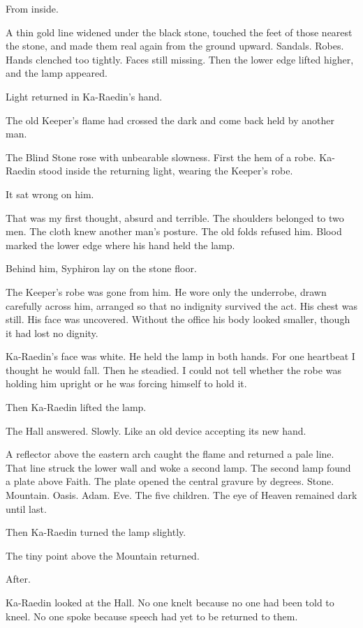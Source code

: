 From inside.\par
A thin gold line widened under the black stone, touched the feet of those nearest the stone, and made them real again from the ground upward.
Sandals.
Robes.
Hands clenched too tightly.
Faces still missing.
Then the lower edge lifted higher, and the lamp appeared.\par
Light returned in Ka-Raedin's hand.\par
The old Keeper's flame had crossed the dark and come back held by another man.\par
The Blind Stone rose with unbearable slowness.
First the hem of a robe.
Ka-Raedin stood inside the returning light, wearing the Keeper's robe.\par
It sat wrong on him.\par
That was my first thought, absurd and terrible.
The shoulders belonged to two men.
The cloth knew another man's posture.
The old folds refused him.
Blood marked the lower edge where his hand held the lamp.\par
Behind him, Syphiron lay on the stone floor.\par
The Keeper's robe was gone from him.
He wore only the underrobe, drawn carefully across him, arranged so that no indignity survived the act.
His chest was still.
His face was uncovered.
Without the office his body looked smaller, though it had lost no dignity.\par
Ka-Raedin's face was white.
He held the lamp in both hands.
For one heartbeat I thought he would fall.
Then he steadied. I could not tell whether the robe was holding him upright or he was forcing himself to hold it.\par
Then Ka-Raedin lifted the lamp.\par
The Hall answered.
Slowly.
Like an old device accepting its new hand.\par
A reflector above the eastern arch caught the flame and returned a pale line.
That line struck the lower wall and woke a second lamp.
The second lamp found a plate above Faith.
The plate opened the central gravure by degrees.
Stone.
Mountain.
Oasis.
Adam.
Eve.
The five children.
The eye of Heaven remained dark until last.\par
Then Ka-Raedin turned the lamp slightly.\par
The tiny point above the Mountain returned.\par
After.\par
Ka-Raedin looked at the Hall.
No one knelt because no one had been told to kneel.
No one spoke because speech had yet to be returned to them.
